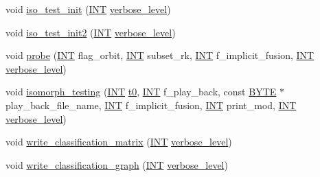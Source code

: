\begin{DoxyCompactItemize}
\item 
void \mbox{\hyperlink{classisomorph_a71d125f4cc34ac9a2160e565021802f8}{iso\+\_\+test\+\_\+init}} (\mbox{\hyperlink{galois_8h_a09fddde158a3a20bd2dcadb609de11dc}{I\+NT}} \mbox{\hyperlink{simeon_8_c_a818073fbcc2f439e7c56952f67386122}{verbose\+\_\+level}})
\item 
void \mbox{\hyperlink{classisomorph_a5aa54ad741dc6c43e688f6c66dae798d}{iso\+\_\+test\+\_\+init2}} (\mbox{\hyperlink{galois_8h_a09fddde158a3a20bd2dcadb609de11dc}{I\+NT}} \mbox{\hyperlink{simeon_8_c_a818073fbcc2f439e7c56952f67386122}{verbose\+\_\+level}})
\item 
void \mbox{\hyperlink{classisomorph_a9cb6fed7b6ac639d886b117a1f454441}{probe}} (\mbox{\hyperlink{galois_8h_a09fddde158a3a20bd2dcadb609de11dc}{I\+NT}} flag\+\_\+orbit, \mbox{\hyperlink{galois_8h_a09fddde158a3a20bd2dcadb609de11dc}{I\+NT}} subset\+\_\+rk, \mbox{\hyperlink{galois_8h_a09fddde158a3a20bd2dcadb609de11dc}{I\+NT}} f\+\_\+implicit\+\_\+fusion, \mbox{\hyperlink{galois_8h_a09fddde158a3a20bd2dcadb609de11dc}{I\+NT}} \mbox{\hyperlink{simeon_8_c_a818073fbcc2f439e7c56952f67386122}{verbose\+\_\+level}})
\item 
void \mbox{\hyperlink{classisomorph_ad7945ec94ba0ba16953482edfaa4da6e}{isomorph\+\_\+testing}} (\mbox{\hyperlink{galois_8h_a09fddde158a3a20bd2dcadb609de11dc}{I\+NT}} \mbox{\hyperlink{translation__plane__main_8_c_a4268f4fe222ffb119218a0199f5e1904}{t0}}, \mbox{\hyperlink{galois_8h_a09fddde158a3a20bd2dcadb609de11dc}{I\+NT}} f\+\_\+play\+\_\+back, const \mbox{\hyperlink{galois_8h_ab6cc7b4aeb6ea31aba2b3fbfc83ff5e6}{B\+Y\+TE}} $\ast$play\+\_\+back\+\_\+file\+\_\+name, \mbox{\hyperlink{galois_8h_a09fddde158a3a20bd2dcadb609de11dc}{I\+NT}} f\+\_\+implicit\+\_\+fusion, \mbox{\hyperlink{galois_8h_a09fddde158a3a20bd2dcadb609de11dc}{I\+NT}} print\+\_\+mod, \mbox{\hyperlink{galois_8h_a09fddde158a3a20bd2dcadb609de11dc}{I\+NT}} \mbox{\hyperlink{simeon_8_c_a818073fbcc2f439e7c56952f67386122}{verbose\+\_\+level}})
\item 
void \mbox{\hyperlink{classisomorph_a1d9175a939d7ae194d582e862b6b0189}{write\+\_\+classification\+\_\+matrix}} (\mbox{\hyperlink{galois_8h_a09fddde158a3a20bd2dcadb609de11dc}{I\+NT}} \mbox{\hyperlink{simeon_8_c_a818073fbcc2f439e7c56952f67386122}{verbose\+\_\+level}})
\item 
void \mbox{\hyperlink{classisomorph_afcf732909fe6b9f431362fa7c2ade0e5}{write\+\_\+classification\+\_\+graph}} (\mbox{\hyperlink{galois_8h_a09fddde158a3a20bd2dcadb609de11dc}{I\+NT}} \mbox{\hyperlink{simeon_8_c_a818073fbcc2f439e7c56952f67386122}{verbose\+\_\+level}})

\end{DoxyCompactItemize}
